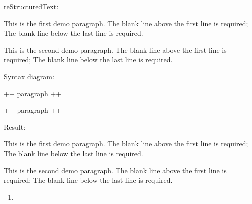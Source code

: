 \documentclass[letterpaper,11pt,english]{sphinxmanual}
\begin{document}
reStructuredText:

\begin{sphinxVerbatim}[commandchars=\\\{\}]
This is the first demo paragraph. The blank line above
the first line is required; The blank line below the last
line is required.

This is the second demo paragraph. The blank line above
the first line is required; The blank line below the last
line is required.
\end{sphinxVerbatim}

Syntax diagram:

\begin{sphinxVerbatim}[commandchars=\\\{\}]
+\PYGZhy{}\PYGZhy{}\PYGZhy{}\PYGZhy{}\PYGZhy{}\PYGZhy{}\PYGZhy{}\PYGZhy{}\PYGZhy{}\PYGZhy{}\PYGZhy{}\PYGZhy{}\PYGZhy{}\PYGZhy{}\PYGZhy{}\PYGZhy{}\PYGZhy{}\PYGZhy{}\PYGZhy{}\PYGZhy{}\PYGZhy{}\PYGZhy{}\PYGZhy{}\PYGZhy{}\PYGZhy{}\PYGZhy{}\PYGZhy{}\PYGZhy{}\PYGZhy{}\PYGZhy{}+
 paragraph                    \textbar{}
                              \textbar{}
+\PYGZhy{}\PYGZhy{}\PYGZhy{}\PYGZhy{}\PYGZhy{}\PYGZhy{}\PYGZhy{}\PYGZhy{}\PYGZhy{}\PYGZhy{}\PYGZhy{}\PYGZhy{}\PYGZhy{}\PYGZhy{}\PYGZhy{}\PYGZhy{}\PYGZhy{}\PYGZhy{}\PYGZhy{}\PYGZhy{}\PYGZhy{}\PYGZhy{}\PYGZhy{}\PYGZhy{}\PYGZhy{}\PYGZhy{}\PYGZhy{}\PYGZhy{}\PYGZhy{}\PYGZhy{}+

+\PYGZhy{}\PYGZhy{}\PYGZhy{}\PYGZhy{}\PYGZhy{}\PYGZhy{}\PYGZhy{}\PYGZhy{}\PYGZhy{}\PYGZhy{}\PYGZhy{}\PYGZhy{}\PYGZhy{}\PYGZhy{}\PYGZhy{}\PYGZhy{}\PYGZhy{}\PYGZhy{}\PYGZhy{}\PYGZhy{}\PYGZhy{}\PYGZhy{}\PYGZhy{}\PYGZhy{}\PYGZhy{}\PYGZhy{}\PYGZhy{}\PYGZhy{}\PYGZhy{}\PYGZhy{}+
 paragraph                    \textbar{}
                              \textbar{}
+\PYGZhy{}\PYGZhy{}\PYGZhy{}\PYGZhy{}\PYGZhy{}\PYGZhy{}\PYGZhy{}\PYGZhy{}\PYGZhy{}\PYGZhy{}\PYGZhy{}\PYGZhy{}\PYGZhy{}\PYGZhy{}\PYGZhy{}\PYGZhy{}\PYGZhy{}\PYGZhy{}\PYGZhy{}\PYGZhy{}\PYGZhy{}\PYGZhy{}\PYGZhy{}\PYGZhy{}\PYGZhy{}\PYGZhy{}\PYGZhy{}\PYGZhy{}\PYGZhy{}\PYGZhy{}+
\end{sphinxVerbatim}

Result:

This is the first demo paragraph. The blank line above the first
line is required; The blank line below the last line is required.

This is the second demo paragraph. The blank line above the first
line is required; The blank line below the last line is required.
\begin{enumerate}
\def\theenumi{\arabic{enumi}}
\def\labelenumi{\theenumi .}
\makeatletter\def\p@enumii{\p@enumi \theenumi .}\makeatother
\setcounter{enumi}{1}
\item {} 

\end{enumerate}
\end{document}
